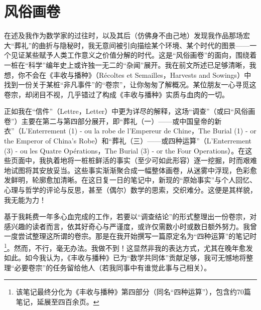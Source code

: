 \section{风俗画卷}

在述及我作为数学家的过往时，以及其后（仿佛身不由己地）发现我作品那场宏大“葬礼”的曲折与隐秘时，我无意间被引向描绘某个环境、某个时代的图景——一个见证某些赋予人类工作意义之价值分解的时代。这是“风俗画卷”的面向，围绕着一桩在“科学”编年史上或许独一无二的“杂闻”展开。我在前文所述已足够清晰，我想，你不会在《丰收与播种》（Récoltes et Semailles，Harvests and Sowings）中找到一份关于某桩“非凡事件”的“卷宗”，让你匆匆了解概况。某位朋友一心寻觅这卷宗，却闭目不视，几乎错过了构成《丰收与播种》实质与血肉的一切。

正如我在“信件”（Lettre，Letter）中更为详尽的解释，这场“调查”（或曰“风俗画卷”）主要在第二与第四部分展开，即“葬礼（一）——或中国皇帝的新衣”（L'Enterrement (1) - ou la robe de l'Empereur de Chine，The Burial (1) - or the Emperor of China's Robe）和“葬礼（三）——或四种运算”（L'Enterrement (3) - ou les Quatre Opérations，The Burial (3) - or the Four Operations）。在这些页面中，我执着地将一桩桩鲜活的事实（至少可如此形容）逐一挖掘，时而艰难地试图将其安放妥当。这些事实渐渐聚合成一幅整体画卷，从迷雾中浮现，色彩愈发鲜明，轮廓愈加清晰。在这日复一日的笔记中，新现的“原始事实”与个人回忆、心理与哲学的评论与反思，甚至（偶尔）数学的思索，交织难分。这便是其样貌，我无能为力！

基于我耗费一年多心血完成的工作，若要以“调查结论”的形式整理出一份卷宗，对感兴趣的读者而言，依其好奇心与严谨度，或许仅需数小时或数日额外努力。我曾一度尝试整理这所谓的卷宗。那是在我开始撰写一篇原定名为“四种运算”的笔记时\footnote{该笔记最终分化为《丰收与播种》第四部分（同名“四种运算”），包含约70篇笔记，延展至四百余页。}。然而，不行，毫无办法。我做不到！这显然非我的表达方式，尤其在晚年愈发如此。如今我认为，《丰收与播种》已为“数学共同体”贡献足够，我可无憾地将整理“必要卷宗”的任务留给他人（若我同事中有谁觉此事与己相关）。
